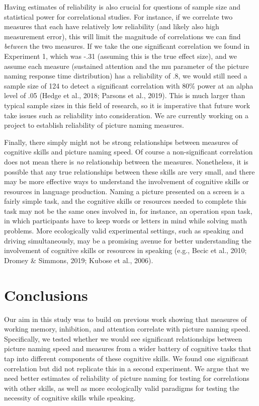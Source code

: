 \documentclass[
  man,floatsintext]{apa6}
\begin{document}
Having estimates of reliability is also crucial for questions of sample size and statistical power for correlational studies. For instance, if we correlate two measures that each have relatively low reliability (and likely also high measurement error), this will limit the magnitude of correlations we can find \emph{between} the two measures. If we take the one significant correlation we found in Experiment 1, which was -.31 (assuming this is the true effect size), and we assume each measure (sustained attention and the mu parameter of the picture naming response time distribution) has a reliability of .8, we would still need a sample size of 124 to detect a significant correlation with 80\% power at an alpha level of .05 (Hedge et al., 2018; Parsons et al., 2019). This is much larger than typical sample sizes in this field of research, so it is imperative that future work take issues such as reliability into consideration. We are currently working on a project to establish reliability of picture naming measures.

Finally, there simply might not be strong relationships between measures of cognitive skills and picture naming speed. Of course a non-significant correlation does not mean there is \emph{no} relationship between the measures. Nonetheless, it is possible that any true relationships between these skills are very small, and there may be more effective ways to understand the involvement of cognitive skills or resources in language production. Naming a picture presented on a screen is a fairly simple task, and the cognitive skills or resources needed to complete this task may not be the same ones involved in, for instance, an operation span task, in which participants have to keep words or letters in mind while solving math problems. More ecologically valid experimental settings, such as speaking and driving simultaneously, may be a promising avenue for better understanding the involvement of cognitive skills or resources in speaking (e.g., Becic et al., 2010; Dromey \& Simmons, 2019; Kubose et al., 2006).

\hypertarget{conclusions}{%
\section{Conclusions}\label{conclusions}}

Our aim in this study was to build on previous work showing that measures of working memory, inhibition, and attention correlate with picture naming speed. Specifically, we tested whether we would see significant relationships between picture naming speed and measures from a wider battery of cognitive tasks that tap into different components of these cognitive skills. We found one significant correlation but did not replicate this in a second experiment. We argue that we need better estimates of reliability of picture naming for testing for correlations with other skills, as well as more ecologically valid paradigms for testing the necessity of cognitive skills while speaking.
\end{document}
